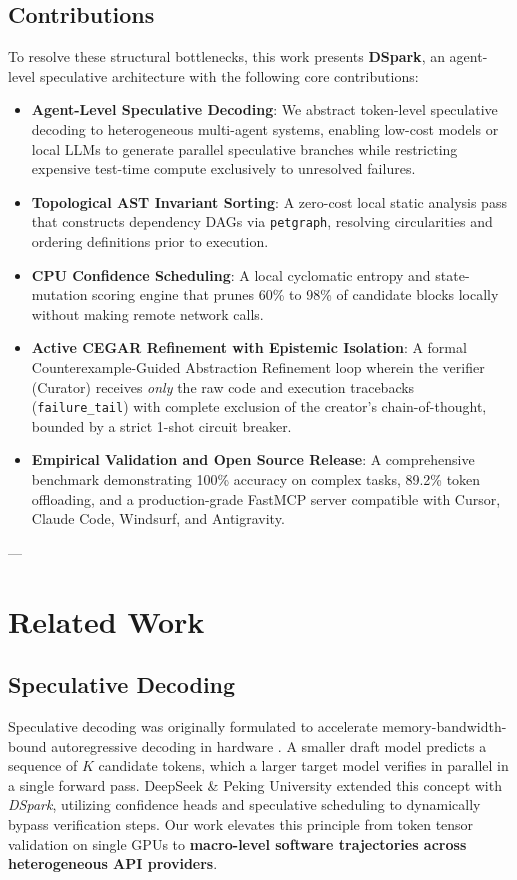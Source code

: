 \documentclass[10pt,twocolumn,letterpaper]{article}
\begin{document}
\subsection{Contributions}
To resolve these structural bottlenecks, this work presents \textbf{DSpark}, an agent-level speculative architecture with the following core contributions:
\begin{itemize}
    \item \textbf{Agent-Level Speculative Decoding}: We abstract token-level speculative decoding \cite{deepseek2026dspark} to heterogeneous multi-agent systems, enabling low-cost models or local LLMs to generate parallel speculative branches while restricting expensive test-time compute exclusively to unresolved failures.
    \item \textbf{Topological AST Invariant Sorting}: A zero-cost local static analysis pass that constructs dependency DAGs via \texttt{petgraph}, resolving circularities and ordering definitions prior to execution.
    \item \textbf{CPU Confidence Scheduling}: A local cyclomatic entropy and state-mutation scoring engine that prunes 60\% to 98\% of candidate blocks locally without making remote network calls.
    \item \textbf{Active CEGAR Refinement with Epistemic Isolation}: A formal Counterexample-Guided Abstraction Refinement loop wherein the verifier (Curator) receives \textit{only} the raw code and execution tracebacks (\texttt{failure\_tail}) with complete exclusion of the creator's chain-of-thought, bounded by a strict 1-shot circuit breaker.
    \item \textbf{Empirical Validation and Open Source Release}: A comprehensive benchmark demonstrating 100\% accuracy on complex tasks, 89.2\% token offloading, and a production-grade FastMCP server compatible with Cursor, Claude Code, Windsurf, and Antigravity.
\end{itemize}

---

\section{Related Work}

\subsection{Speculative Decoding}
Speculative decoding was originally formulated to accelerate memory-bandwidth-bound autoregressive decoding in hardware \cite{leviathan2023fast,chen2023speculative}. A smaller draft model predicts a sequence of $K$ candidate tokens, which a larger target model verifies in parallel in a single forward pass. DeepSeek \& Peking University \cite{deepseek2026dspark} extended this concept with \textit{DSpark}, utilizing confidence heads and speculative scheduling to dynamically bypass verification steps. Our work elevates this principle from token tensor validation on single GPUs to \textbf{macro-level software trajectories across heterogeneous API providers}.
\end{document}
